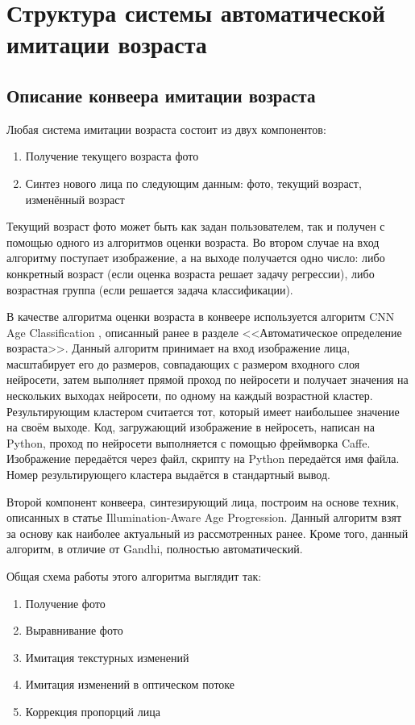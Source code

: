 \newpage

\section{Структура системы автоматической имитации возраста}

\subsection{Описание конвеера имитации возраста}

Любая система имитации возраста состоит из двух компонентов:
\begin{enumerate}
\item Получение текущего возраста фото
\item Синтез нового лица по следующим данным: фото, текущий возраст, изменённый возраст
\end{enumerate}
Текущий возраст фото может быть как задан пользователем, так и получен с помощью одного из алгоритмов оценки возраста.
Во втором случае на вход алгоритму поступает изображение, а на выходе получается одно число: либо конкретный возраст (если оценка возраста решает задачу регрессии), либо возрастная группа (если решается задача классификации).

В качестве алгоритма оценки возраста в конвеере используется алгоритм CNN Age Classification \cite{cnn_age_gender}, описанный ранее в разделе <<Автоматическое определение возраста>>. Данный алгоритм принимает на вход изображение лица, масштабирует его до размеров, совпадающих с размером входного слоя нейросети, затем выполняет прямой проход по нейросети и получает значения на нескольких выходах нейросети, по одному на каждый возрастной кластер. Результирующим кластером считается тот, который имеет наибольшее значение на своём выходе.
Код, загружающий изображение в нейросеть, написан на Python, проход по нейросети выполняется с помощью фреймворка Caffe. Изображение передаётся через файл, скрипту на Python передаётся имя файла. Номер результирующего кластера выдаётся в стандартный вывод.

Второй компонент конвеера, синтезирующий лица, построим на основе техник, описанных в статье Illumination-Aware Age Progression. Данный алгоритм взят за основу как наиболее актуальный из рассмотренных ранее. Кроме того, данный алгоритм, в отличие от Gandhi, полностью автоматический.

Общая схема работы этого алгоритма выглядит так:
\begin{enumerate}
\item Получение фото
\item Выравнивание фото
\item Имитация текстурных изменений
\item Имитация изменений в оптическом потоке
\item Коррекция пропорций лица
\end{enumerate}

